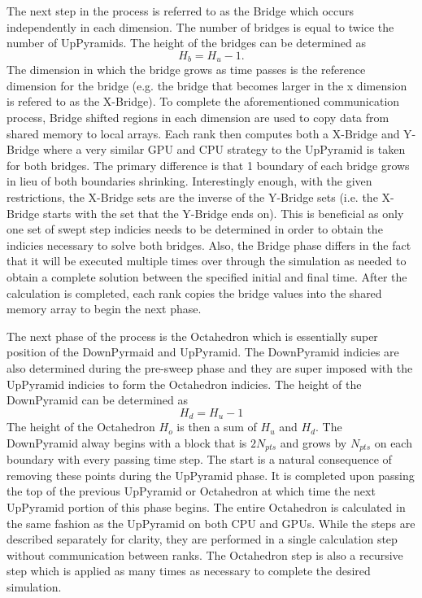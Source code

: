 \documentclass[review]{elsarticle}
\begin{document}
\par The next step in the process is referred to as the Bridge which occurs independently in each dimension. The number of bridges is equal to twice the number of UpPyramids. The height of the bridges can be determined as
\begin{equation}
  H_{b} = H_{u}-1.
\end{equation}
The dimension in which the bridge grows as time passes is the reference dimension for the bridge (e.g. the bridge that becomes larger in the x dimension is refered to as the X-Bridge). To complete the aforementioned communication process, Bridge shifted regions in each dimension are used to copy data from shared memory to local arrays. Each rank then computes both a X-Bridge and Y-Bridge where a very similar GPU and CPU strategy to the UpPyramid is taken for both bridges. The primary difference is that 1 boundary of each bridge grows in lieu of both boundaries shrinking. Interestingly enough, with the given restrictions, the X-Bridge sets are the inverse of the Y-Bridge sets (i.e. the X-Bridge starts with the set that the Y-Bridge ends on). This is beneficial as only one set of swept step indicies needs to be determined in order to obtain the indicies necessary to solve both bridges. Also, the Bridge phase differs in the fact that it will be executed multiple times over through the simulation as needed to obtain a complete solution between the specified initial and final time. After the calculation is completed, each rank copies the bridge values into the shared memory array to begin the next phase.

\par The next phase of the process is the Octahedron which is essentially super position of the DownPyrmaid and UpPyramid. The DownPyramid indicies are also determined during the pre-sweep phase and they are super imposed with the UpPyramid indicies to form the Octahedron indicies.
The height of the DownPyramid can be determined as
\begin{equation}
  H_{d} =  H_{u}-1
\end{equation}
The height of the Octahedron $H_o$ is then a sum of $H_u$ and $H_d$. The DownPyramid alway begins with a block that is $2N_{pts}$ and grows by $N_{pts}$ on each boundary with every passing time step. The  start is a natural consequence of removing these points during the UpPyramid phase. It is completed upon passing the top of the previous UpPyramid or Octahedron at which time the next UpPyramid portion of this phase begins. The entire Octahedron is calculated in the same fashion as the UpPyramid on both CPU and GPUs. While the steps are described separately for clarity, they are performed in a single calculation step without communication between ranks. The Octahedron step is also a recursive step which is applied as many times as necessary to complete the desired simulation.
\end{document}
